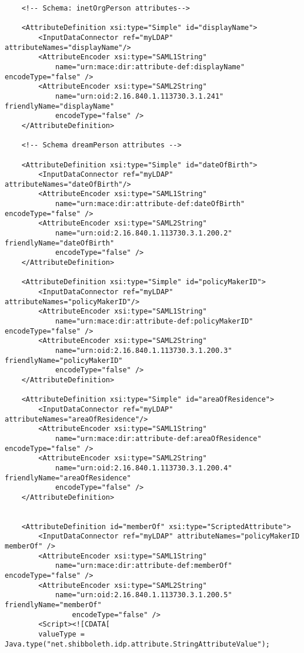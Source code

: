 \begin{verbatim}
    <!-- Schema: inetOrgPerson attributes-->

    <AttributeDefinition xsi:type="Simple" id="displayName">
        <InputDataConnector ref="myLDAP" attributeNames="displayName"/>
        <AttributeEncoder xsi:type="SAML1String" 
            name="urn:mace:dir:attribute-def:displayName" encodeType="false" />
        <AttributeEncoder xsi:type="SAML2String" 
            name="urn:oid:2.16.840.1.113730.3.1.241" friendlyName="displayName" 
            encodeType="false" />
    </AttributeDefinition>

	<!-- Schema dreamPerson attributes -->
	
	<AttributeDefinition xsi:type="Simple" id="dateOfBirth">
        <InputDataConnector ref="myLDAP" attributeNames="dateOfBirth"/>
        <AttributeEncoder xsi:type="SAML1String" 
            name="urn:mace:dir:attribute-def:dateOfBirth" encodeType="false" />
        <AttributeEncoder xsi:type="SAML2String" 
            name="urn:oid:2.16.840.1.113730.3.1.200.2" friendlyName="dateOfBirth" 
            encodeType="false" />
    </AttributeDefinition>

	<AttributeDefinition xsi:type="Simple" id="policyMakerID">
        <InputDataConnector ref="myLDAP" attributeNames="policyMakerID"/>
        <AttributeEncoder xsi:type="SAML1String" 
            name="urn:mace:dir:attribute-def:policyMakerID" encodeType="false" />
        <AttributeEncoder xsi:type="SAML2String" 
            name="urn:oid:2.16.840.1.113730.3.1.200.3" friendlyName="policyMakerID" 
            encodeType="false" />
    </AttributeDefinition>

	<AttributeDefinition xsi:type="Simple" id="areaOfResidence">
        <InputDataConnector ref="myLDAP" attributeNames="areaOfResidence"/>
        <AttributeEncoder xsi:type="SAML1String" 
            name="urn:mace:dir:attribute-def:areaOfResidence" encodeType="false" />
        <AttributeEncoder xsi:type="SAML2String" 
            name="urn:oid:2.16.840.1.113730.3.1.200.4" friendlyName="areaOfResidence" 
            encodeType="false" />
    </AttributeDefinition>
   

	<AttributeDefinition id="memberOf" xsi:type="ScriptedAttribute">
    	<InputDataConnector ref="myLDAP" attributeNames="policyMakerID memberOf" />
    	<AttributeEncoder xsi:type="SAML1String" 
    	    name="urn:mace:dir:attribute-def:memberOf" encodeType="false" />
        <AttributeEncoder xsi:type="SAML2String"
            name="urn:oid:2.16.840.1.113730.3.1.200.5" friendlyName="memberOf" 
                encodeType="false" />
    	<Script><![CDATA[
        valueType = Java.type("net.shibboleth.idp.attribute.StringAttributeValue");


\end{verbatim}
